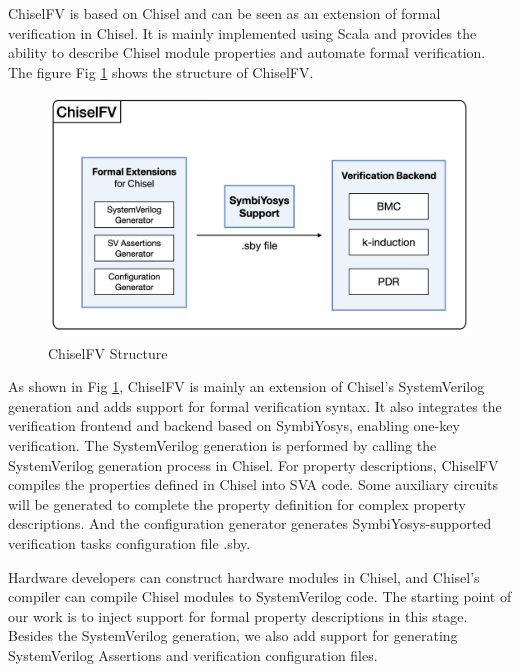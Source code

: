 \documentclass[conference]{IEEEtran}
\theoremstyle{definition}
\begin{document}
ChiselFV is based on Chisel and can be seen as an extension of formal verification in Chisel. 
It is mainly implemented using Scala and provides the ability to describe Chisel module properties and automate formal verification. 
The figure Fig \ref{fig: structure} shows the structure of ChiselFV.

\begin{figure}[!htbp]
    \begin{center}
    \includegraphics[width=1\linewidth]{pics/structure.png}
    \caption{ChiselFV Structure}
    \label{fig: structure}
    \end{center}
\end{figure}

As shown in Fig \ref{fig: structure}, ChiselFV is mainly an extension of Chisel's SystemVerilog generation and adds support for formal verification syntax. It also integrates the verification frontend and backend based on SymbiYosys, enabling one-key verification. The SystemVerilog generation is performed by calling the SystemVerilog generation process in Chisel. 
For property descriptions, ChiselFV compiles the properties defined in Chisel into SVA code. Some auxiliary circuits will be generated to complete the property definition for complex property descriptions.
And the configuration generator generates SymbiYosys-supported verification tasks configuration file .sby. 

Hardware developers can construct hardware modules in Chisel, and Chisel's compiler can compile Chisel modules to SystemVerilog code. The starting point of our work is to inject support for formal property descriptions in this stage.
Besides the SystemVerilog generation, we also add support for generating SystemVerilog Assertions and verification configuration files.
\end{document}
